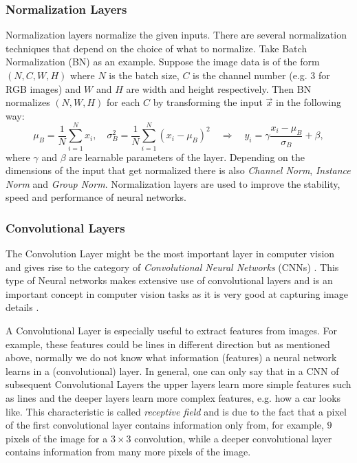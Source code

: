 \subsubsection{Normalization Layers}
Normalization layers normalize the given inputs. There are several normalization techniques that depend on the choice of what to normalize. Take Batch Normalization (BN) \cite{batch_norm} as an example. Suppose the image data is of the form $(N, C, W, H)$ where $N$ is the batch size, $C$ is the channel number (e.g. $3$ for RGB images) and $W$ and $H$ are width and height respectively. Then BN normalizes $(N, W, H)$ for each $C$ by transforming the input $\vec{x}$ in the following way:
%
\begin{equation} \label{equ:2.3}
    \mu_B=\frac{1}{N}\sum_{i=1}^Nx_i, \quad\sigma_B^2=\frac{1}{N}\sum_{i=1}^N(x_i-\mu_B)^2\quad \Longrightarrow\quad y_i=\gamma\frac{x_i-\mu_B}{\sigma_B}+\beta,
\end{equation}
%
where $\gamma$ and $\beta$ are learnable parameters of the layer. Depending on the dimensions of the input that get normalized there is also \textit{Channel Norm}, \textit{Instance Norm} and \textit{Group Norm}. Normalization layers are used to improve the stability, speed and performance of neural networks.
%
\subsubsection{Convolutional Layers}
The Convolution Layer might be the most important layer in computer vision and gives rise to the category of \textit{Convolutional Neural Networks} (CNNs) \cite{cnn}. This type of Neural networks makes extensive use of convolutional layers and is an important concept in computer vision tasks as it is very good at capturing image details \cite{deep_image_prior}.

A Convolutional Layer is especially useful to extract features from images. For example, these features could be lines in different direction but as mentioned above, normally we do not know what information (features) a neural network learns in a (convolutional) layer. In general, one can only say that in a CNN of subsequent Convolutional Layers the upper layers learn more simple features such as lines and the deeper layers learn more complex features, e.g. how a car looks like. This characteristic is called \textit{receptive field} and is due to the fact that a pixel of the first convolutional layer contains information only from, for example, $9$ pixels of the image for a $3\times3$ convolution, while a deeper convolutional layer contains information from many more pixels of the image.


